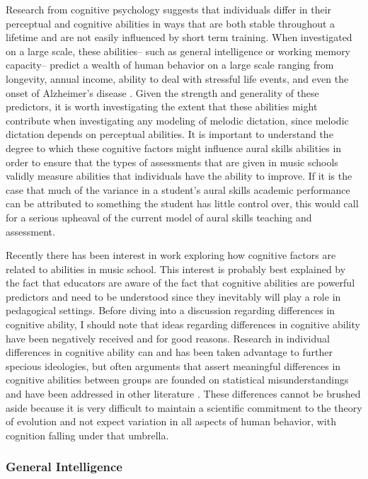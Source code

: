 \documentclass[12pt,]{book}
\begin{document}
Research from cognitive psychology suggests that individuals differ in their perceptual and cognitive abilities in ways that are both stable throughout a lifetime and are not easily influenced by short term training.
When investigated on a large scale, these abilities-- such as general intelligence or working memory capacity-- predict a wealth of human behavior on a large scale ranging from longevity, annual income, ability to deal with stressful life events, and even the onset of Alzheimer's disease \citep{ritchieIntelligenceAllThat2015, unsworthAutomatedVersionOperation2005}.
Given the strength and generality of these predictors, it is worth investigating the extent that these abilities might contribute when investigating any modeling of melodic dictation, since melodic dictation depends on perceptual abilities.
It is important to understand the degree to which these cognitive factors might influence aural skills abilities in order to ensure that the types of assessments that are given in music schools validly measure abilities that individuals have the ability to improve.
If it is the case that much of the variance in a student's aural skills academic performance can be attributed to something the student has little control over, this would call for a serious upheaval of the current model of aural skills teaching and assessment.

Recently there has been interest in work exploring how cognitive factors are related to abilities in music school.
This interest is probably best explained by the fact that educators are aware of the fact that cognitive abilities are powerful predictors and need to be understood since they inevitably will play a role in pedagogical settings.
Before diving into a discussion regarding differences in cognitive ability, I should note that ideas regarding differences in cognitive ability have been negatively received and for good reasons.
Research in individual differences in cognitive ability can and has been taken advantage to further specious ideologies, but often arguments that assert meaningful differences in cognitive abilities between groups are founded on statistical misunderstandings and have been addressed in other literature \citep{gouldMismeasureMan1996}.
These differences cannot be brushed aside because it is very difficult to maintain a scientific commitment to the theory of evolution \citep{darwinOriginSpecies1859} and not expect variation in all aspects of human behavior, with cognition falling under that umbrella.

\hypertarget{general-intelligence}{%
\subsubsection{General Intelligence}\label{general-intelligence}}
\end{document}
